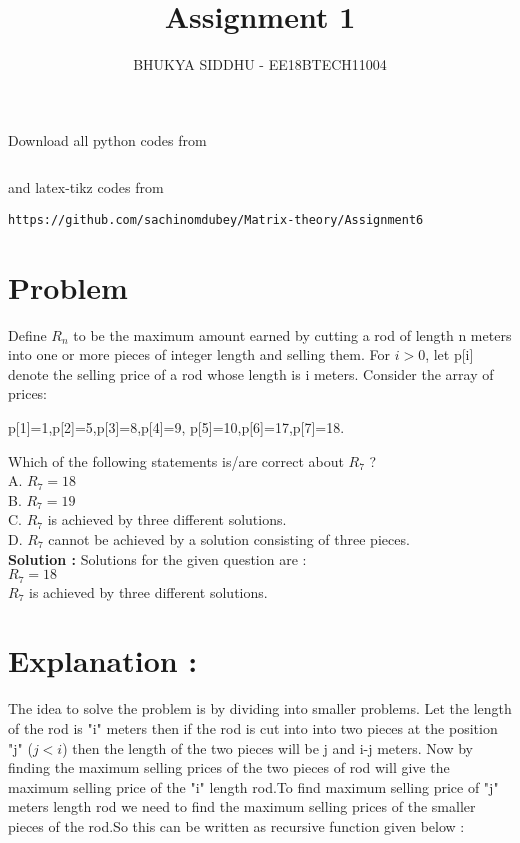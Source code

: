 \documentclass[journal,12pt,twocolumn]{IEEEtran}
\begin{document}
     \def\rightbox#1{\makebox[0in][r]{#1}}
     \def\centbox#1{\makebox[0in]{#1}}
     \def\topbox#1{\raisebox{-\baselineskip}[0in][0in]{#1}}
     \def\midbox#1{\raisebox{-0.5\baselineskip}[0in][0in]{#1}}
\vspace{3cm}
\title{Assignment 1}
\author{BHUKYA SIDDHU - EE18BTECH11004}
\maketitle
\newpage
\bigskip
\renewcommand{\thefigure}{\theenumi}
\renewcommand{\thetable}{\theenumi}
Download all python codes from 
\begin{lstlisting}

\end{lstlisting}
%
and latex-tikz codes from 
%
\begin{lstlisting}
https://github.com/sachinomdubey/Matrix-theory/Assignment6
\end{lstlisting}
\section{Problem}
Define $R_{n}$ to be the maximum amount earned by cutting a rod of length n meters into one or more pieces of integer length and selling them. For $i>0$, let p[i] denote the selling price of a rod whose length is i meters. Consider the array of prices:\\
\begin{center}
    p[1]=1,p[2]=5,p[3]=8,p[4]=9,
    p[5]=10,p[6]=17,p[7]=18.
\end{center}
Which of the following statements is/are correct about $R_{7}$ ?\\
\newline
A. $R_{7}=18$\\
B. $R_{7}=19$\\
C. $R_{7}$ is achieved by three different solutions.\\
D. $R_{7}$ cannot be achieved by a solution consisting of three pieces.\\
\newline
\textbf{Solution :}
\newline
Solutions for the given question are :\\
$R_{7}=18$\\
$R_{7}$ is achieved by three different solutions.\\
\section{Explanation :}
The idea to solve the problem is by dividing into smaller problems. Let the length of the rod is "i" meters then if the rod is cut into into two pieces at the position "j" ($j<i$) then the length of the two pieces will be j and i-j meters. Now by finding the maximum selling prices of the two pieces of rod will give the maximum selling price of the "i" length rod.To find maximum selling price of "j" meters length rod we need to find the maximum selling prices of the smaller pieces of the rod.So this can be written as recursive function given below :
\end{document}
